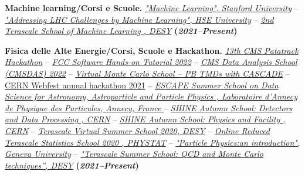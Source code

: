 \documentclass[11pt]{res}
\begin{document}
\begin{resume}
\textbf{Machine learning/Corsi e Scuole.}
\href{https://www.coursera.org/account/accomplishments/verify/DRRN6452E8WB?utm_product=course}{\textit{"Machine Learning", Stanford University}} -- \href{https://www.coursera.org/account/accomplishments/certificate/MY4HQAEAYL9D}{\textit{"Addressing LHC Challenges by Machine Learning",  HSE University}} -- \href{https://drive.google.com/file/d/11AAS10GLKvA5oR2oZmcjLj1YBwBevQue/view?usp=sharing}{\textit{2nd Terascale School of Machine Learning , DESY}} \textbf{(\textit{2021--Present})}

\textbf{Fisica delle Alte Energie/Corsi, Scuole e Hackathon.}
\href{https://indico.cern.ch/event/1246472/}{\textit{13th CMS Patatrack Hackathon}} -- \href{https://indico.cern.ch/event/1182767/}{\textit{FCC Software Hands-on Tutorial 2022}} -- \href{https://lpc.fnal.gov/programs/schools-workshops/cmsdas.shtml}{\textit{CMS Data Analysis School (CMSDAS) 2022}} -- \href{https://drive.google.com/file/d/1Ui4phtxuFPd-trfQp6jCmL4qZOgEJvlf/view}{\textit{Virtual Monte Carlo School -- PB TMDs with CASCADE}} -- \href{https://drive.google.com/file/d/14agcBsN5tkP3eKP2QEpU_cq4_jxhDvRT/view?usp=sharing}{CERN Webfest annual hackathon 2021} -- \href{https://drive.google.com/file/d/1D9BjE1nlL8UmRmZ3HQNqC6Cq1OxK0zB-/view?usp=sharing}{\textit{ESCAPE Summer School on Data Science for Astronomy, Astroparticle and Particle Physics , Laboratoire d’Annecy de Physique des Particules, Annecy, France }} -- \href{https://indico.cern.ch/event/964916/overview}{\textit{SHINE Autumn School: Detectors and Data Processing , CERN}} -- \href{https://indico.cern.ch/event/963826/}{\textit{SHINE Autumn School: Physics and Facility , CERN}} -- \href{https://indico.desy.de/event/26403/}{\textit{Terascale Virtual Summer School 2020, DESY}} -- \href{https://indico.desy.de/event/25594/}{\textit{Online Reduced Terascale Statistics School 2020 , PHYSTAT}} -- \href{https://www.coursera.org/account/accomplishments/certificate/CMVH65UHPLR3}{\textit{"Particle Physics:an introduction", Geneva University}} -- \href{https://drive.google.com/file/d/1fxuisoVa6oLr7eA6mWlE-xZxAs_ifsk6/view}{\textit{"Terascale Summer School: QCD and Monte Carlo techniques”, DESY}} \textbf{(\textit{2021--Present})}


\end{resume}
\end{document}
